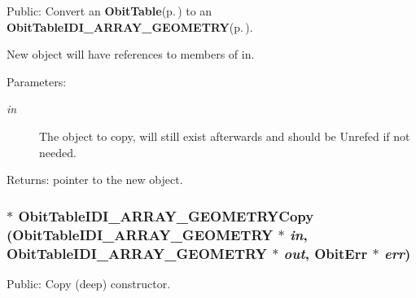 Public: Convert an {\bf Obit\-Table}{\rm (p.\,\pageref{structObitTable})} to an {\bf Obit\-Table\-IDI\_\-ARRAY\_\-GEOMETRY}{\rm (p.\,\pageref{structObitTableIDI__ARRAY__GEOMETRY})}. 

New object will have references to members of in. \begin{Desc}
\item[Parameters:]
\begin{description}
\item[{\em in}]The object to copy, will still exist afterwards and should be Unrefed if not needed. \end{description}
\end{Desc}
\begin{Desc}
\item[Returns:]pointer to the new object. \end{Desc}
\subsubsection{$\ast$ Obit\-Table\-IDI\_\-ARRAY\_\-GEOMETRYCopy ({\bf Obit\-Table\-IDI\_\-ARRAY\_\-GEOMETRY} $\ast$ {\em in}, {\bf Obit\-Table\-IDI\_\-ARRAY\_\-GEOMETRY} $\ast$ {\em out}, {\bf Obit\-Err} $\ast$ {\em err})}\label{ObitTableIDI__ARRAY__GEOMETRY_8c_a20}


Public: Copy (deep) constructor. 

